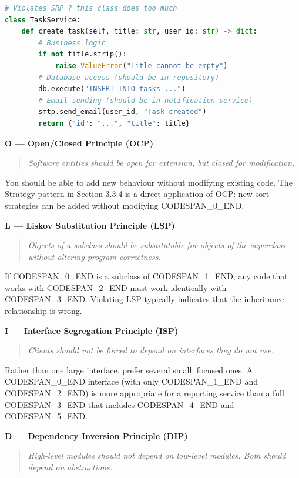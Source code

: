 \documentclass[11pt,a4paper]{book}
\begin{document}
\begin{lstlisting}[language=Python]
# Violates SRP ? this class does too much
class TaskService:
    def create_task(self, title: str, user_id: str) -> dict:
        # Business logic
        if not title.strip():
            raise ValueError("Title cannot be empty")
        # Database access (should be in repository)
        db.execute("INSERT INTO tasks ...")
        # Email sending (should be in notification service)
        smtp.send_email(user_id, "Task created")
        return {"id": "...", "title": title}
\end{lstlisting}

\textbf{O --- Open/Closed Principle (OCP)}

\begin{quote}
\textit{Software entities should be open for extension, but closed for modification.}
\end{quote}

You should be able to add new behaviour without modifying existing code. The Strategy pattern in Section 3.3.4 is a direct application of OCP: new sort strategies can be added without modifying CODESPAN\_0\_END.

\textbf{L --- Liskov Substitution Principle (LSP)}

\begin{quote}
\textit{Objects of a subclass should be substitutable for objects of the superclass without altering program correctness.}
\end{quote}

If CODESPAN\_0\_END is a subclass of CODESPAN\_1\_END, any code that works with CODESPAN\_2\_END must work identically with CODESPAN\_3\_END. Violating LSP typically indicates that the inheritance relationship is wrong.

\textbf{I --- Interface Segregation Principle (ISP)}

\begin{quote}
\textit{Clients should not be forced to depend on interfaces they do not use.}
\end{quote}

Rather than one large interface, prefer several small, focused ones. A CODESPAN\_0\_END interface (with only CODESPAN\_1\_END and CODESPAN\_2\_END) is more appropriate for a reporting service than a full CODESPAN\_3\_END that includes CODESPAN\_4\_END and CODESPAN\_5\_END.

\textbf{D --- Dependency Inversion Principle (DIP)}

\begin{quote}
\textit{High-level modules should not depend on low-level modules. Both should depend on abstractions.}
\end{quote}
\end{document}
